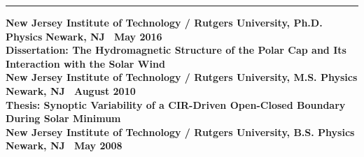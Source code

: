 \documentclass[10pt]{article}
\newcommand{\ressection}[1]{\noindent{\large\textbf{#1}}
\vspace{2pt}\hrule\vspace{4pt}}
\newcommand{\leftandright}[2]{\noindent\textbf{#1}\hfill
\textbf{#2}}
\begin{document}
\begin{itemize*}


\end{itemize*}



\vspace{0.2cm}
\ressection{Education}

\leftandright{New Jersey Institute of Technology / Rutgers University,
\textmd{Ph.D. Physics}}{Newark, NJ
\textbullet\, May 2016} \\  
\leftandright{}{Dissertation: \textmd{The Hydromagnetic Structure of the
Polar Cap and Its Interaction with the Solar Wind}}\\  

\leftandright{New Jersey Institute of Technology / Rutgers University,
\textmd{M.S. Physics}}{Newark, NJ
\textbullet\, August 2010} \\  
\leftandright{}{Thesis: \textmd{Synoptic Variability of a CIR-Driven Open-Closed
Boundary During Solar Minimum}}\\  

\leftandright{New Jersey Institute of Technology / Rutgers University,
\textmd{B.S. Physics}}{Newark, NJ
\textbullet\, May 2008} \\  


\end{document}
